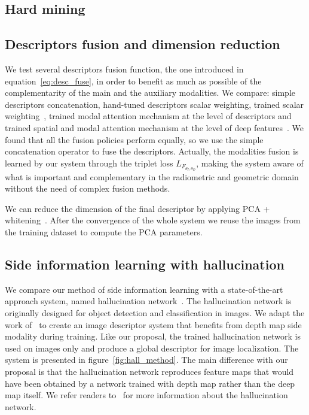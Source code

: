 \subsection{Hard mining}


\subsection{Descriptors fusion and dimension reduction}
\label{subsec:fuse_desc}
We test several descriptors fusion function, the one introduced in equation~\ref{eq:desc_fuse}, in order to benefit as much as possible of the complementarity of the main and the auxiliary modalities. We compare: simple descriptors concatenation, hand-tuned descriptors scalar weighting, trained scalar weighting~\cite{Sizikova2016}, trained modal attention mechanism at the level of descriptors and trained spatial and modal attention mechanism at the level of deep features~\cite{Seymour2018}. We found that all the fusion policies perform equally, so we use the simple concatenation operator to fuse the descriptors. Actually, the modalities fusion is learned by our system through the triplet loss $L_{F_{\theta_{I}, \theta_{D}}}$, making the system aware of what is important and complementary in the radiometric and geometric domain without the need of complex fusion methods.

We can reduce the dimension of the final descriptor by applying PCA + whitening~\cite{Arandjelovic2017, Radenovic2017, Gordo2017}. After the convergence of the whole system we reuse the images from the training dataset to compute the PCA parameters.

\subsection{Side information learning with hallucination}
\label{subsec:hall}
We compare our method of side information learning with a state-of-the-art approach system, named hallucination network~\cite{Hoffman2016}. The hallucination network is originally designed for object detection and classification in images. We adapt the work of~\cite{Hoffman2016} to create an image descriptor system that benefits from depth map side modality during training. Like our proposal, the trained hallucination network is used on images only and produce a global descriptor for image localization. The system is presented in figure~\ref{fig:hall_method}. The main difference with our proposal is that the hallucination network reproduces feature maps that would have been obtained by a network trained with depth map rather than the deep map itself. We refer readers to~\cite{Hoffman2016} for more information about the hallucination network.

